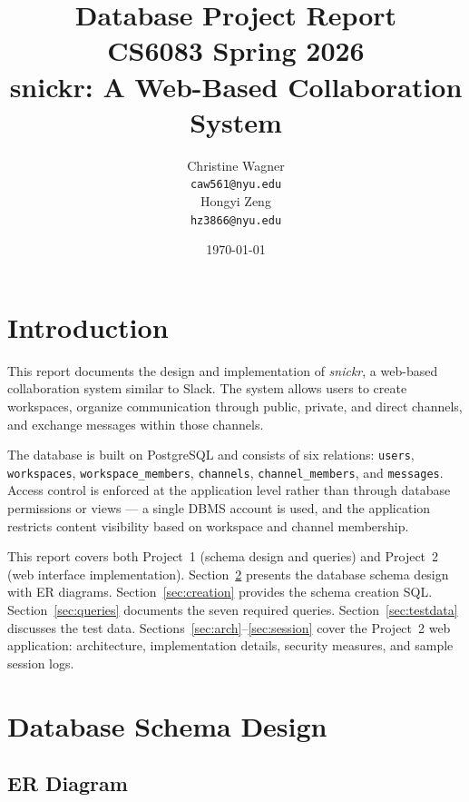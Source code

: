\documentclass[11pt]{article}
\title{Database Project Report \\ \large CS6083 Spring 2026 \\ \large snickr: A Web-Based Collaboration System}
\author{
    \begin{tabular}[t]{c}
        Christine Wagner \\
        \texttt{caw561@nyu.edu}
    \end{tabular}
    \hspace{2em}
    \begin{tabular}[t]{c}
        Hongyi Zeng \\
        \texttt{hz3866@nyu.edu}
    \end{tabular}
}
\date{\today}
\begin{document}
\maketitle

\tableofcontents
\newpage


\section{Introduction}

This report documents the design and implementation of \textit{snickr}, a web-based collaboration system similar to Slack. The system allows users to create workspaces, organize communication through public, private, and direct channels, and exchange messages within those channels.

The database is built on PostgreSQL and consists of six relations: \texttt{users}, \texttt{workspaces}, \texttt{workspace\_members}, \texttt{channels}, \texttt{channel\_members}, and \texttt{messages}. Access control is enforced at the application level rather than through database permissions or views --- a single DBMS account is used, and the application restricts content visibility based on workspace and channel membership.

This report covers both Project~1 (schema design and queries) and Project~2 (web interface implementation). Section~\ref{sec:schema} presents the database schema design with ER diagrams. Section~\ref{sec:creation} provides the schema creation SQL. Section~\ref{sec:queries} documents the seven required queries. Section~\ref{sec:testdata} discusses the test data. Sections~\ref{sec:arch}--\ref{sec:session} cover the Project~2 web application: architecture, implementation details, security measures, and sample session logs.


\section{Database Schema Design}
\label{sec:schema}

\subsection{ER Diagram}
\end{document}
